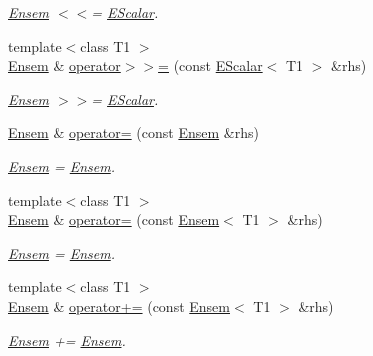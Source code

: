 \begin{DoxyCompactItemize}
\begin{DoxyCompactList}\small\item\em \mbox{\hyperlink{classENSEM_1_1Ensem}{Ensem}} $<$$<$= \mbox{\hyperlink{classENSEM_1_1EScalar}{E\+Scalar}}. \end{DoxyCompactList}\item 
{\footnotesize template$<$class T1 $>$ }\\\mbox{\hyperlink{classENSEM_1_1Ensem}{Ensem}} \& \mbox{\hyperlink{classENSEM_1_1Ensem_a9511b1d1b45de39920d451700eecd4d9}{operator$>$$>$=}} (const \mbox{\hyperlink{classENSEM_1_1EScalar}{E\+Scalar}}$<$ T1 $>$ \&rhs)
\begin{DoxyCompactList}\small\item\em \mbox{\hyperlink{classENSEM_1_1Ensem}{Ensem}} $>$$>$= \mbox{\hyperlink{classENSEM_1_1EScalar}{E\+Scalar}}. \end{DoxyCompactList}\item 
\mbox{\hyperlink{classENSEM_1_1Ensem}{Ensem}} \& \mbox{\hyperlink{classENSEM_1_1Ensem_a2f4f881dde88dfaf425051580e477e6c}{operator=}} (const \mbox{\hyperlink{classENSEM_1_1Ensem}{Ensem}} \&rhs)
\begin{DoxyCompactList}\small\item\em \mbox{\hyperlink{classENSEM_1_1Ensem}{Ensem}} = \mbox{\hyperlink{classENSEM_1_1Ensem}{Ensem}}. \end{DoxyCompactList}\item 
{\footnotesize template$<$class T1 $>$ }\\\mbox{\hyperlink{classENSEM_1_1Ensem}{Ensem}} \& \mbox{\hyperlink{classENSEM_1_1Ensem_a83f34607867df5f1fb9ad887354de48d}{operator=}} (const \mbox{\hyperlink{classENSEM_1_1Ensem}{Ensem}}$<$ T1 $>$ \&rhs)
\begin{DoxyCompactList}\small\item\em \mbox{\hyperlink{classENSEM_1_1Ensem}{Ensem}} = \mbox{\hyperlink{classENSEM_1_1Ensem}{Ensem}}. \end{DoxyCompactList}\item 
{\footnotesize template$<$class T1 $>$ }\\\mbox{\hyperlink{classENSEM_1_1Ensem}{Ensem}} \& \mbox{\hyperlink{classENSEM_1_1Ensem_ae24bd27a7f5a8ffed6ad4361956596fd}{operator+=}} (const \mbox{\hyperlink{classENSEM_1_1Ensem}{Ensem}}$<$ T1 $>$ \&rhs)
\begin{DoxyCompactList}\small\item\em \mbox{\hyperlink{classENSEM_1_1Ensem}{Ensem}} += \mbox{\hyperlink{classENSEM_1_1Ensem}{Ensem}}. \end{DoxyCompactList}\item 

\end{DoxyCompactItemize}

